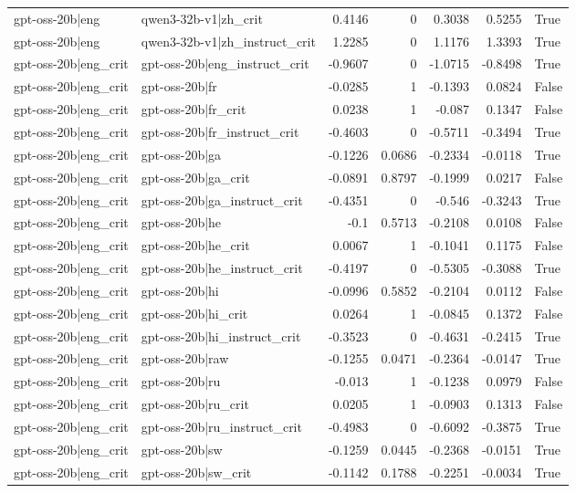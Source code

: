 \begin{table}
\begin{tabular}{l l r r r r l}
gpt-oss-20b|eng & qwen3-32b-v1|zh_crit & 0.4146 & 0 & 0.3038 & 0.5255 & True \\
gpt-oss-20b|eng & qwen3-32b-v1|zh_instruct_crit & 1.2285 & 0 & 1.1176 & 1.3393 & True \\
gpt-oss-20b|eng_crit & gpt-oss-20b|eng_instruct_crit & -0.9607 & 0 & -1.0715 & -0.8498 & True \\
gpt-oss-20b|eng_crit & gpt-oss-20b|fr & -0.0285 & 1 & -0.1393 & 0.0824 & False \\
gpt-oss-20b|eng_crit & gpt-oss-20b|fr_crit & 0.0238 & 1 & -0.087 & 0.1347 & False \\
gpt-oss-20b|eng_crit & gpt-oss-20b|fr_instruct_crit & -0.4603 & 0 & -0.5711 & -0.3494 & True \\
gpt-oss-20b|eng_crit & gpt-oss-20b|ga & -0.1226 & 0.0686 & -0.2334 & -0.0118 & True \\
gpt-oss-20b|eng_crit & gpt-oss-20b|ga_crit & -0.0891 & 0.8797 & -0.1999 & 0.0217 & False \\
gpt-oss-20b|eng_crit & gpt-oss-20b|ga_instruct_crit & -0.4351 & 0 & -0.546 & -0.3243 & True \\
gpt-oss-20b|eng_crit & gpt-oss-20b|he & -0.1 & 0.5713 & -0.2108 & 0.0108 & False \\
gpt-oss-20b|eng_crit & gpt-oss-20b|he_crit & 0.0067 & 1 & -0.1041 & 0.1175 & False \\
gpt-oss-20b|eng_crit & gpt-oss-20b|he_instruct_crit & -0.4197 & 0 & -0.5305 & -0.3088 & True \\
gpt-oss-20b|eng_crit & gpt-oss-20b|hi & -0.0996 & 0.5852 & -0.2104 & 0.0112 & False \\
gpt-oss-20b|eng_crit & gpt-oss-20b|hi_crit & 0.0264 & 1 & -0.0845 & 0.1372 & False \\
gpt-oss-20b|eng_crit & gpt-oss-20b|hi_instruct_crit & -0.3523 & 0 & -0.4631 & -0.2415 & True \\
gpt-oss-20b|eng_crit & gpt-oss-20b|raw & -0.1255 & 0.0471 & -0.2364 & -0.0147 & True \\
gpt-oss-20b|eng_crit & gpt-oss-20b|ru & -0.013 & 1 & -0.1238 & 0.0979 & False \\
gpt-oss-20b|eng_crit & gpt-oss-20b|ru_crit & 0.0205 & 1 & -0.0903 & 0.1313 & False \\
gpt-oss-20b|eng_crit & gpt-oss-20b|ru_instruct_crit & -0.4983 & 0 & -0.6092 & -0.3875 & True \\
gpt-oss-20b|eng_crit & gpt-oss-20b|sw & -0.1259 & 0.0445 & -0.2368 & -0.0151 & True \\
gpt-oss-20b|eng_crit & gpt-oss-20b|sw_crit & -0.1142 & 0.1788 & -0.2251 & -0.0034 & True \\

\end{tabular}
\end{table}

